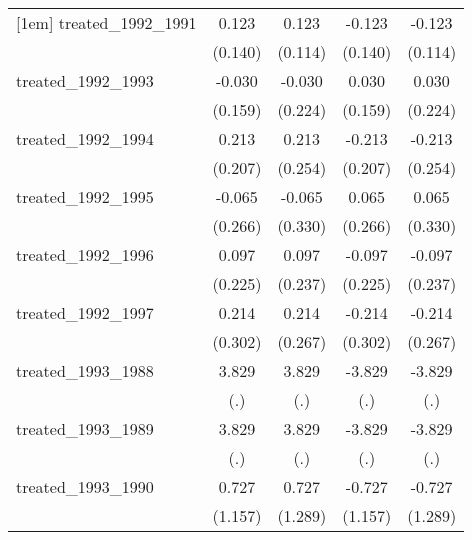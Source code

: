 {\begin{tabular}{l*{4}{c}}
[1em]
treated\_1992\_1991&       0.123         &       0.123         &      -0.123         &      -0.123         \\
            &     (0.140)         &     (0.114)         &     (0.140)         &     (0.114)         \\
[1em]
treated\_1992\_1993&      -0.030         &      -0.030         &       0.030         &       0.030         \\
            &     (0.159)         &     (0.224)         &     (0.159)         &     (0.224)         \\
[1em]
treated\_1992\_1994&       0.213         &       0.213         &      -0.213         &      -0.213         \\
            &     (0.207)         &     (0.254)         &     (0.207)         &     (0.254)         \\
[1em]
treated\_1992\_1995&      -0.065         &      -0.065         &       0.065         &       0.065         \\
            &     (0.266)         &     (0.330)         &     (0.266)         &     (0.330)         \\
[1em]
treated\_1992\_1996&       0.097         &       0.097         &      -0.097         &      -0.097         \\
            &     (0.225)         &     (0.237)         &     (0.225)         &     (0.237)         \\
[1em]
treated\_1992\_1997&       0.214         &       0.214         &      -0.214         &      -0.214         \\
            &     (0.302)         &     (0.267)         &     (0.302)         &     (0.267)         \\
[1em]
treated\_1993\_1988&       3.829         &       3.829         &      -3.829         &      -3.829         \\
            &         (.)         &         (.)         &         (.)         &         (.)         \\
[1em]
treated\_1993\_1989&       3.829         &       3.829         &      -3.829         &      -3.829         \\
            &         (.)         &         (.)         &         (.)         &         (.)         \\
[1em]
treated\_1993\_1990&       0.727         &       0.727         &      -0.727         &      -0.727         \\
            &     (1.157)         &     (1.289)         &     (1.157)         &     (1.289)         \\

\end{tabular}}
